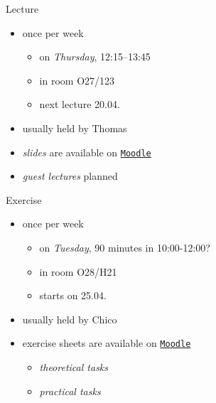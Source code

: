 \begin{frame}{\myframetitle}
	\begin{mycolumns}
		\begin{definition}{Lecture}
			\begin{itemize}
				\item once per week
				\begin{itemize}
					\item on \emph{Thursday}, 12:15--13:45
					\item in room O27/123
					\item next lecture 20.04.
				\end{itemize}
				\item usually held by Thomas
				\item \emph{slides} are available on \texttt{\href{https://moodle.uni-ulm.de/course/view.php?id=37352}{Moodle}}
				\item \emph{guest lectures} planned
			\end{itemize}
		\end{definition}
	\mynextcolumn
		\begin{example}{Exercise}
			\begin{itemize}
				\item once per week
				\begin{itemize}
					\item on \emph{Tuesday}, 90 minutes in 10:00-12:00?
					\item in room O28/H21
					\item starts on 25.04.
				\end{itemize}
				\item usually held by Chico
				\item exercise sheets are available on \texttt{\href{https://moodle.uni-ulm.de/course/view.php?id=37352}{Moodle}}
				\begin{itemize}
					\item \emph{theoretical tasks}
					\item \emph{practical tasks}
				\end{itemize}
			\end{itemize}
		\end{example}
	\end{mycolumns}
\end{frame}


